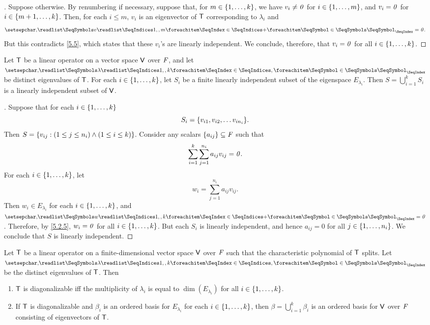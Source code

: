 \begin{proof}[]
  Suppose otherwise.
  By renumbering if necessary, suppose that, for \(m \in \left\lbrace1, \dots, k\right\rbrace\), we have \(v_i \neq \mathit{0}\) for \(i \in \left\lbrace1, \dots, m\right\rbrace\), and \(v_i = \mathit{0}\) for \(i \in \left\lbrace m + 1, \dots, k\right\rbrace\).
  Then, for each \(i \leq m\), \(v_i\) is an eigenvector of \(\mathsf{T}\) corresponding to \(\lambda_i\) and
  \[
    \seq[+]{v}{1,,m} = \zv.
  \]
  But this contradicts \cref{5.5}, which states that these \(v_i\)'s are linearly independent.
  We conclude, therefore, that \(v_i = \mathit{0}\) for all \(i \in \left\lbrace1, \dots, k\right\rbrace\).
\end{proof}

\begin{thm}\label{5.8}
  Let \(\mathsf{T}\) be a linear operator on a vector space \(\mathsf{V}\) over \(\mathit{F}\), and let \(\seq{\lambda}{1,,k}\) be distinct eigenvalues of \(\mathsf{T}\).
  For each \(i \in \left\lbrace1, \dots, k\right\rbrace\), let \(S_i\) be a finite linearly independent subset of the eigenspace \(E_{\lambda_i}\).
  Then \(S = \bigcup_{i = 1}^k S_i\) is a linearly independent subset of \(\mathsf{V}\).
\end{thm}

\begin{proof}[]
  Suppose that for each \(i \in \left\lbrace1, \dots, k\right\rbrace\)
  \[
    S_i = \set{v_{i 1}, v_{i 2}, \dots v_{i n_i}}.
  \]
  Then \(S = \left\lbrace v_{i j} : (1 \leq j \leq n_i) \land (1 \leq i \leq k)\right\rbrace\).
  Consider any scalars \(\left\lbrace a_{i j}\right\rbrace \subseteq \mathit{F}\) such that
  \[
    \sum_{i = 1}^k \sum_{j = 1}^{n_i} a_{i j} v_{i j} = \mathit{0}.
  \]
  For each \(i \in \left\lbrace1, \dots, k\right\rbrace\), let
  \[
    w_i = \sum_{j = 1}^{n_i} a_{i j} v_{i j}.
  \]
  Then \(w_i \in E_{\lambda_i}\) for each \(i \in \left\lbrace1, \dots, k\right\rbrace\), and \(\seq[+]{w}{1,,k} = \zv\).
  Therefore, by \cref{5.2.5}, \(w_i = \mathit{0}\) for all \(i \in \left\lbrace1, \dots, k\right\rbrace\).
  But each \(S_i\) is linearly independent, and hence \(a_{i j} = 0\) for all \(j \in \left\lbrace1, \dots, n_i\right\rbrace\).
  We conclude that \(S\) is linearly independent.
\end{proof}

\begin{thm}\label{5.9}
  Let \(\mathsf{T}\) be a linear operator on a finite-dimensional vector space \(\mathsf{V}\) over \(\mathit{F}\) such that the characteristic polynomial of \(\mathsf{T}\) splits.
  Let \(\seq{\lambda}{1,,k}\) be the distinct eigenvalues of \(\mathsf{T}\).
  Then
  \begin{enumerate}
    \item \(\mathsf{T}\) is diagonalizable iff the multiplicity of \(\lambda_i\) is equal to \(\dim(E_{\lambda_i})\) for all \(i \in \left\lbrace1, \dots, k\right\rbrace\).
    \item If \(\mathsf{T}\) is diagonalizable and \(\beta_i\) is an ordered basis for \(E_{\lambda_i}\) for each \(i \in \left\lbrace1, \dots, k\right\rbrace\), then \(\beta = \bigcup_{i = 1}^k \beta_i\) is an ordered basis for \(\mathsf{V}\) over \(\mathit{F}\) consisting of eigenvectors of \(\mathsf{T}\).
  \end{enumerate}
\end{thm}

